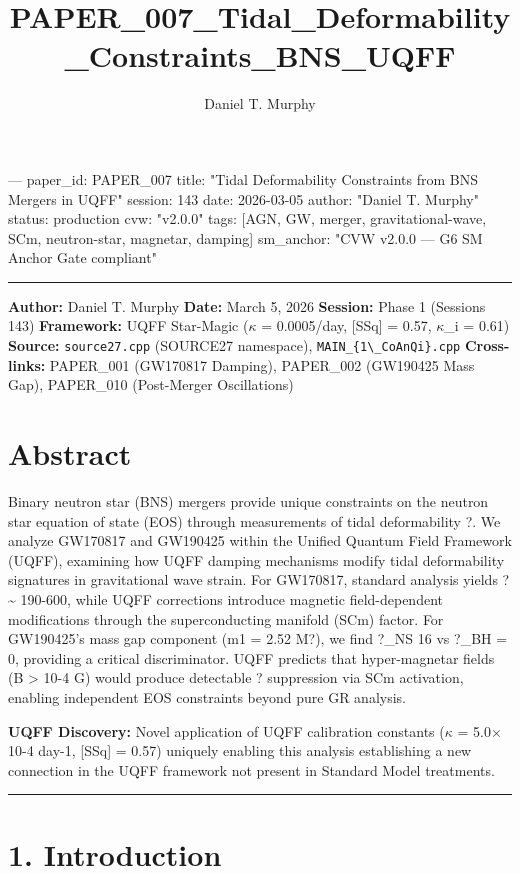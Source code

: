 \documentclass[11pt]{article}
\title{PAPER\_007\_Tidal\_Deformability\_Constraints\_BNS\_UQFF}
\author{Daniel T. Murphy}
\begin{document}
\maketitle
﻿--- paper\_id: PAPER\_007 title: "Tidal Deformability Constraints from BNS Mergers in UQFF" session: 143 date: 2026-03-05 author: "Daniel T. Murphy" status: production cvw: "v2.0.0" tags: [AGN, GW, merger, gravitational-wave, SCm, neutron-star, magnetar, damping] sm\_anchor: "CVW v2.0.0 --- G6 SM Anchor Gate compliant"

\noindent\rule{\textwidth}{0.4pt}

\textbf{Author:} Daniel T. Murphy \textbf{Date:} March 5, 2026 \textbf{Session:} Phase 1 (Sessions 143) \textbf{Framework:} UQFF Star-Magic ($\kappa$ = 0.0005/day, [SSq] = 0.57, $\kappa$\_i = 0.61) \textbf{Source:} \verb|source27.cpp| (SOURCE27 namespace), \verb|MAIN_{1\_CoAnQi}.cpp| \textbf{Cross-links:} PAPER\_001 (GW170817 Damping), PAPER\_002 (GW190425 Mass Gap), PAPER\_010 (Post-Merger Oscillations)

\section*{Abstract}

Binary neutron star (BNS) mergers provide unique constraints on the neutron star equation of state (EOS) through measurements of tidal deformability ?. We analyze GW170817 and GW190425 within the Unified Quantum Field Framework (UQFF), examining how UQFF damping mechanisms modify tidal deformability signatures in gravitational wave strain. For GW170817, standard analysis yields ? \textasciitilde{} 190-600, while UQFF corrections introduce magnetic field-dependent modifications through the superconducting manifold (SCm) factor. For GW190425's mass gap component (m1 = 2.52 M?), we find ?\_NS  16 vs ?\_BH = 0, providing a critical discriminator. UQFF predicts that hyper-magnetar fields (B > 10-4 G) would produce detectable ? suppression via SCm activation, enabling independent EOS constraints beyond pure GR analysis.

\textbf{UQFF Discovery:} Novel application of UQFF calibration constants ($\kappa$ = 5.0$\times$10-4 day-1, [SSq] = 0.57) uniquely enabling this analysis  establishing a new connection in the UQFF framework not present in Standard Model treatments.

\noindent\rule{\textwidth}{0.4pt}

\section*{1. Introduction}
\end{document}
